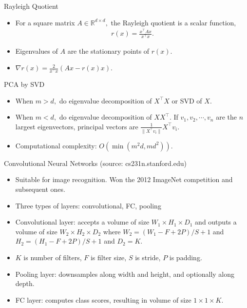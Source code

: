 \documentclass[final]{beamer}
\begin{document}
\begin{frame}{Rayleigh Quotient}
\begin{itemize}
	\item For a square matrix $A \in \mathbb{R}^{d\times d},$ the Rayleigh quotient is a scalar function,
	\begin{align*}
		r(x) = \frac{x^\top A x}{x^\top x}.
	\end{align*}
	\pause
	\item Eigenvalues of $A$ are the stationary points of $r(x)$.
	\pause
	\item $\nabla r(x) = \frac{2}{x^\top x} (Ax - r(x)x)$.
\end{itemize}
\end{frame}
\begin{frame}{PCA by SVD}
	\begin{itemize}
		\item When $m > d,$ do eigenvalue decomposition of $X^\top X$ or SVD of $X$.
		\pause
		\item When $m < d,$ do eigenvalue decomposition of $XX^\top.$ If $v_1, v_2,\cdots, v_n$ are the $n$ largest eigenvectors, principal vectors are $\frac{1}{\|X^\top v_i\|} X^\top v_i$.
		\pause
		\item Computational complexity: $O(\min(m^2d, md^2))$.

	\end{itemize}

\end{frame}
\begin{frame}{Convolutional Neural Networks (source: cs231n.stanford.edu)}
	\begin{itemize}
		\item Suitable for image recognition. Won the 2012 ImageNet competition and subsequent ones.
		\item Three types of layers: convolutional, FC, pooling
		\item Convolutional layer: accepts a volume of size $W_1 \times H_1 \times D_1$ and outputs a volume of size $W_2 \times H_2 \times D_2$ where $W_2 = (W_1 - F + 2P)/S + 1$ and $H_2 = (H_1 - F + 2P)/S + 1$ and $D_2 = K$.

		\item $K$ is number of filters, $F$ is filter size, $S$ is stride, $P$ is padding.
		\item Pooling layer: downsamples along width and height, and optionally along depth.
		\item FC layer: computes class scores, resulting in volume of size $1 \times 1 \times K$.

	
	\end{itemize}
\end{frame}
\end{document}
